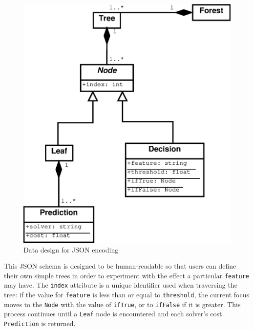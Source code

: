 \begin{figure}
\centering
\includegraphics[width=0.8\linewidth]{Figures/data}
\caption[Data design for JSON encoding]{Data design for JSON encoding}
\label{fig:json}
\end{figure}
%
%

This JSON schema is designed to be human-readable so that users can define their own simple trees in order to experiment with the effect a particular \texttt{feature} may have.
The \texttt{index} attribute is a unique identifier used when traversing the tree: if the value for \texttt{feature} is less than or equal to \texttt{threshold}, the current focus moves to the \texttt{Node} with the value of \texttt{ifTrue}, or to \texttt{ifFalse} if it is greater.
This process continues until a \texttt{Leaf} node is encountered and each solver's cost \texttt{Prediction} is returned.

